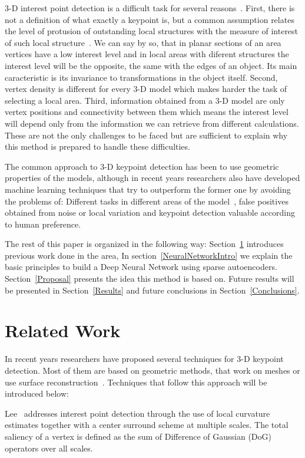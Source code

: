\documentclass{comjnl}
\begin{document}
3-D interest point detection is a difficult task for several reasons~\cite{Discrim, harris3D}.
First, there is not a definition of what exactly a keypoint is, but a common
assumption relates the level of protusion of outstanding local structures
with the measure of interest of such local structure~\cite{harris3D}.
We can say by so, that in planar sections of an area
vertices have a low interest level and in local areas with diferent
structures the interest level will be the opposite, the same with
the edges of an object. Its main caracteristic is its
invariance to transformations in the object itself. Second, vertex 
density is different for every 3-D model which makes harder the task of
selecting a local area. Third, information obtained from a 3-D model
are only vertex positions and connectivity between them which means
the interest level will depend only from the information we can
retrieve from different calculations. These are not the only challenges
to be faced but are sufficient to explain why this method is prepared to
handle these difficulties. 

The common approach to 3-D keypoint detection has been to use 
geometric properties of the models, although in recent years researchers
also have developed machine learning techniques that try to outperform the
former one by avoiding the problems of: Different tasks in different areas
of the model~\cite{DNN}, false positives obtained from noise or local
variation and keypoint detection valuable according to human preference. 

The rest of this paper is organized in the following way:
Section~\ref{RelatedWork} introduces previous work done in the area,
In section~\ref{NeuralNetworkIntro} we explain the basic principles to
build a Deep Neural Network using sparse autoencoders.
Section~\ref{Proposal} presents the idea this method is based on. Future
results will be presented in Section~\ref{Results} and future conclusions
in Section~\ref{Conclusions}.

\section{Related Work} \label{RelatedWork}
In recent years researchers have proposed several techniques for
3-D keypoint detection. Most of them are based on geometric methods,
that work on meshes or use surface reconstruction~\cite{UnstructuredPointCloud}.
Techniques that follow this approach will be introduced below:

Lee~\cite{Lee01} addresses interest point detection through the
use of local curvature estimates together with a center
surround scheme at multiple scales. The total saliency of
a vertex is defined as the sum of Difference of Gaussian
(DoG) operators over all scales.
\end{document}
